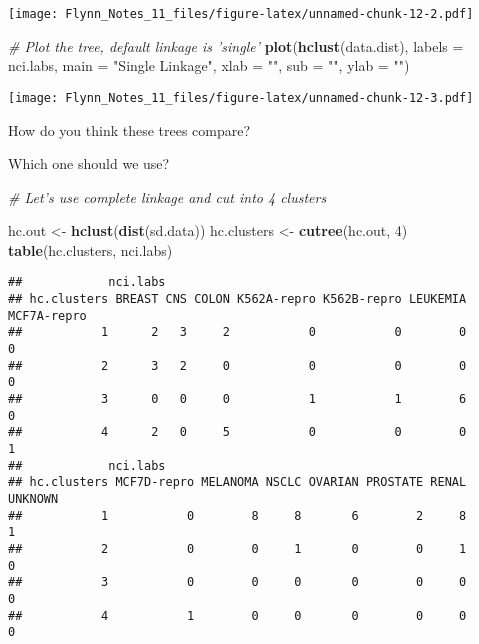 \documentclass[]{article}
\newenvironment{Shaded}{\begin{snugshade}}{\end{snugshade}}
\newcommand{\KeywordTok}[1]{\textcolor[rgb]{0.13,0.29,0.53}{\textbf{#1}}}
\newcommand{\DataTypeTok}[1]{\textcolor[rgb]{0.13,0.29,0.53}{#1}}
\newcommand{\DecValTok}[1]{\textcolor[rgb]{0.00,0.00,0.81}{#1}}
\newcommand{\StringTok}[1]{\textcolor[rgb]{0.31,0.60,0.02}{#1}}
\newcommand{\CommentTok}[1]{\textcolor[rgb]{0.56,0.35,0.01}{\textit{#1}}}
\newcommand{\NormalTok}[1]{#1}
\begin{document}
\texttt{[image: Flynn\_Notes\_11\_files/figure-latex/unnamed-chunk-12-2.pdf]}

\begin{Shaded}
\begin{Highlighting}[]
\CommentTok{# Plot the tree, default linkage is 'single'}
\KeywordTok{plot}\NormalTok{(}\KeywordTok{hclust}\NormalTok{(data.dist), }\DataTypeTok{labels =}\NormalTok{ nci.labs, }\DataTypeTok{main =} \StringTok{"Single Linkage"}\NormalTok{, }\DataTypeTok{xlab =} \StringTok{""}\NormalTok{, }
     \DataTypeTok{sub =} \StringTok{""}\NormalTok{, }\DataTypeTok{ylab =} \StringTok{""}\NormalTok{)}
\end{Highlighting}
\end{Shaded}

\texttt{[image: Flynn\_Notes\_11\_files/figure-latex/unnamed-chunk-12-3.pdf]}

How do you think these trees compare?

Which one should we use?

\begin{Shaded}
\begin{Highlighting}[]
\CommentTok{# Let's use complete linkage and cut into 4 clusters}

\NormalTok{hc.out <-}\StringTok{ }\KeywordTok{hclust}\NormalTok{(}\KeywordTok{dist}\NormalTok{(sd.data))}
\NormalTok{hc.clusters <-}\StringTok{ }\KeywordTok{cutree}\NormalTok{(hc.out, }\DecValTok{4}\NormalTok{)}
\KeywordTok{table}\NormalTok{(hc.clusters, nci.labs)}
\end{Highlighting}
\end{Shaded}

\begin{verbatim}
##            nci.labs
## hc.clusters BREAST CNS COLON K562A-repro K562B-repro LEUKEMIA MCF7A-repro
##           1      2   3     2           0           0        0           0
##           2      3   2     0           0           0        0           0
##           3      0   0     0           1           1        6           0
##           4      2   0     5           0           0        0           1
##            nci.labs
## hc.clusters MCF7D-repro MELANOMA NSCLC OVARIAN PROSTATE RENAL UNKNOWN
##           1           0        8     8       6        2     8       1
##           2           0        0     1       0        0     1       0
##           3           0        0     0       0        0     0       0
##           4           1        0     0       0        0     0       0
\end{verbatim}
\end{document}
